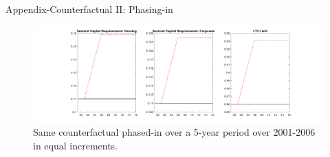 \documentclass[8pt,aspectratio=169]{beamer}
\numberwithin{equation}{section}
\begin{document}
\begin{frame}{Appendix-Counterfactual II: Phasing-in}

\begin{figure}[H]
\centering
\caption{Same counterfactual phased-in over a 5-year period over 2001-2006 in equal increments.}
\includegraphics[scale=0.35]{CF_policy_rules10.pdf}

\end{figure}


\end{frame}
\end{document}
